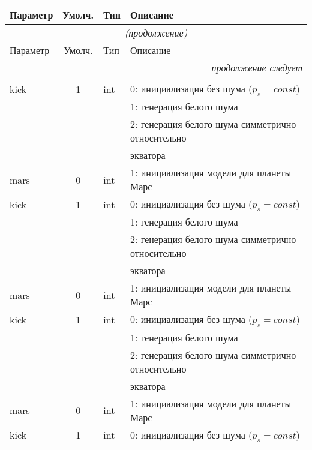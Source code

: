 \begin{longtable}[c]{|l|c|l|l|}
 \hline
 Параметр & Умолч. & Тип & Описание               \\ \hline
                                              \endfirsthead   \hline
 \multicolumn{4}{|c|}{\small\slshape (продолжение)}        \\ \hline
 Параметр & Умолч. & Тип & Описание               \\ \hline
                                              \endhead        \hline
 \multicolumn{4}{|r|}{\small\slshape продолжение следует}  \\ \hline
                                              \endfoot        \hline
                                              \endlastfoot
 \multicolumn{4}{|l|}{\&INP}        \\ \hline 
 kick & 1 & int & 0: инициализация без шума ($p_s = const$) \\
      &   &     & 1: генерация белого шума                  \\
      &   &     & 2: генерация белого шума симметрично относительно \\
  & & & экватора    \\
 mars & 0 & int & 1: инициализация модели для планеты Марс     \\
 kick & 1 & int & 0: инициализация без шума ($p_s = const$) \\
      &   &     & 1: генерация белого шума                  \\
      &   &     & 2: генерация белого шума симметрично относительно \\
  & & & экватора    \\
 mars & 0 & int & 1: инициализация модели для планеты Марс     \\
kick & 1 & int & 0: инициализация без шума ($p_s = const$) \\
      &   &     & 1: генерация белого шума                  \\
      &   &     & 2: генерация белого шума симметрично относительно \\
  & & & экватора    \\
 mars & 0 & int & 1: инициализация модели для планеты Марс     \\
kick & 1 & int & 0: инициализация без шума ($p_s = const$) \\

\end{longtable}
